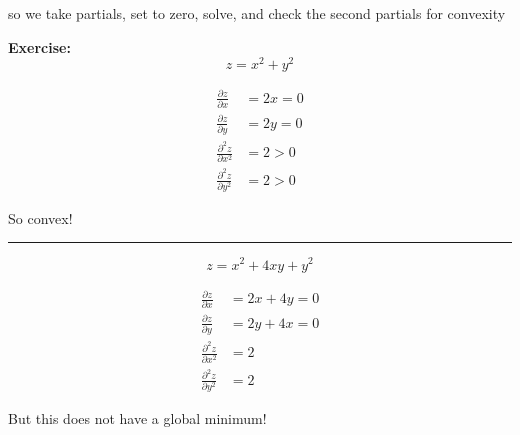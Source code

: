 \documentclass[12pt]{report}
\renewcommand{\div}{\vspace*{10pt}\hrule\vspace*{10pt}}
\newenvironment*{exercise}[1][red]{
    \begin{tcolorbox}[
        parbox=false,
        colback=#1!5!white,
        colframe=#1!75!black,
        breakable
    ]}
    {\end{tcolorbox}}
\begin{document}
so we take partials, set to zero, solve, and check the second partials for convexity

\begin{exercise}
    \textbf{Exercise:} 
    \[z = x^2 + y^2\]

    \begin{align*}
        \frac{\partial z}{\partial x} &= 2x = 0\\ 
        \frac{\partial z}{\partial y} &= 2y = 0\\ 
        \frac{\partial^2 z}{\partial x^2} &= 2 > 0\\
        \frac{\partial^2 z}{\partial y^2} &= 2 > 0
    \end{align*}

    So convex!

    \div 

    \[z = x^2 + 4xy + y^2\]

    \begin{center}
    \end{center}

    \begin{align*}
        \frac{\partial z}{\partial x} &= 2x + 4y = 0\\
        \frac{\partial z}{\partial y} &= 2y + 4x = 0\\
        \frac{\partial^2 z}{\partial x^2} &= 2\\
        \frac{\partial^2 z}{\partial y^2} &= 2
    \end{align*}

    But this does not have a global minimum!
\end{exercise}
\end{document}
